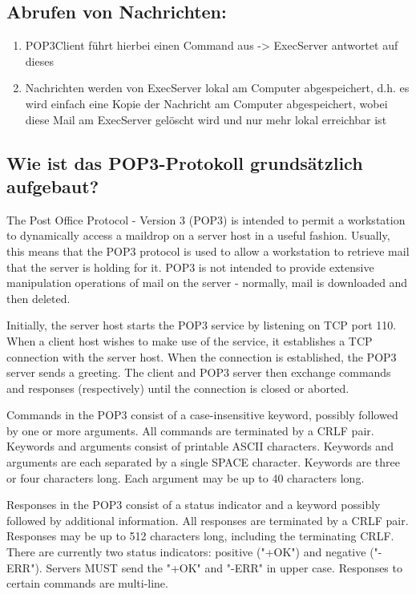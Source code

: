 \documentclass[11pt]{article}
\begin{document}
    \subsection{Abrufen von Nachrichten:}
    \begin{enumerate}

        \item POP3Client führt hierbei einen Command aus -> ExecServer antwortet auf dieses
        \item Nachrichten werden von ExecServer lokal am Computer abgespeichert, d.h. es
        wird einfach eine Kopie der Nachricht am Computer abgespeichert, wobei diese
        Mail am ExecServer gelöscht wird und nur mehr lokal erreichbar ist

    \end{enumerate}
    \subsection{Wie ist das POP3-Protokoll grundsätzlich aufgebaut?}
    The Post Office Protocol - Version 3 (POP3) is intended to
    permit a workstation to dynamically access a maildrop on a server
    host in a useful fashion.  Usually, this means that the POP3 protocol
    is used to allow a workstation to retrieve mail that the server is
    holding for it. POP3 is not intended to provide extensive manipulation operations of
    mail on the server - normally, mail is downloaded and then deleted.

    Initially, the server host starts the POP3 service by listening on
    TCP port 110. When a client host wishes to make use of the service,
    it establishes a TCP connection with the server host.  When the
    connection is established, the POP3 server sends a greeting.  The
    client and POP3 server then exchange commands and responses
    (respectively) until the connection is closed or aborted.

    Commands in the POP3 consist of a case-insensitive keyword, possibly
    followed by one or more arguments.  All commands are terminated by a
    CRLF pair.  Keywords and arguments consist of printable ASCII
    characters.  Keywords and arguments are each separated by a single
    SPACE character.  Keywords are three or four characters long. Each
    argument may be up to 40 characters long.

    Responses in the POP3 consist of a status indicator and a keyword
    possibly followed by additional information.  All responses are
    terminated by a CRLF pair.  Responses may be up to 512 characters
    long, including the terminating CRLF.  There are currently two status
    indicators: positive ("+OK") and negative ("-ERR").  Servers MUST
    send the "+OK" and "-ERR" in upper case. Responses to certain commands are multi-line.
\end{document}
